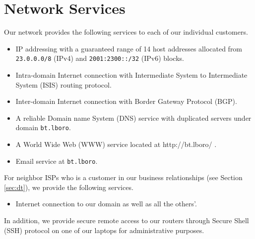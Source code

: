 \section{Network Services}
\label{sec:services}

Our network provides the following services to each of our individual customers.

\begin{itemize}
\item
	IP addressing with a guaranteed range of 14 host addresses allocated from \texttt{23.0.0.0/8} (IPv4) and \texttt{2001:2300::/32} (IPv6) blocks.
\item
	Intra-domain Internet connection with Intermediate System to Intermediate System (ISIS) routing protocol.
\item
	Inter-domain Internet connection with Border Gateway Protocol (BGP).
\item
	A reliable Domain name System (DNS) service with duplicated servers under domain \texttt{bt.lboro}.
\item
	A World Wide Web (WWW) service located at http://bt.lboro/ .
\item
	Email service at \texttt{bt.lboro}.
\end{itemize}



For neighbor ISPs who is a customer in our business relationships (see Section \ref{sec:dt}), we provide the following services.

\begin{itemize}
\item
	Internet connection to our domain as well as all the others'.
\end{itemize}



In addition, we provide secure remote access to our routers through Secure Shell (SSH) protocol on one of our laptops for administrative purposes.

